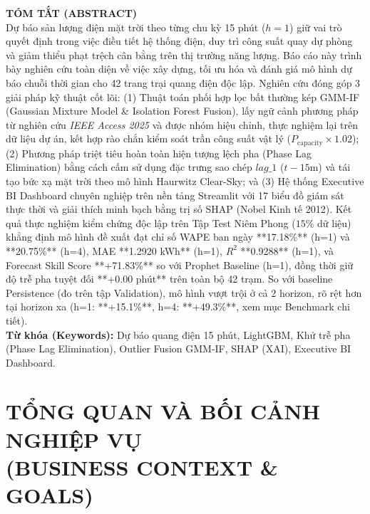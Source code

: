 \documentclass[12pt,a4paper]{article}
\begin{document}
\begin{center}
\begin{minipage}{0.92\linewidth}
\small
\textbf{\large TÓM TẮT (ABSTRACT)} \vspace{0.2cm} \\
Dự báo sản lượng điện mặt trời theo từng chu kỳ 15 phút ($h=1$) giữ vai trò quyết định trong việc điều tiết hệ thống điện, duy trì công suất quay dự phòng và giảm thiểu phạt trệch cân bằng trên thị trường năng lượng. Báo cáo này trình bày nghiên cứu toàn diện về việc xây dựng, tối ưu hóa và đánh giá mô hình dự báo chuỗi thời gian cho 42 trang trại quang điện độc lập. Nghiên cứu đóng góp 3 giải pháp kỹ thuật cốt lõi: (1) Thuật toán phối hợp lọc bất thường kép GMM-IF (Gaussian Mixture Model \& Isolation Forest Fusion), lấy ngữ cảnh phương pháp từ nghiên cứu \textit{IEEE Access 2025} và được nhóm hiệu chỉnh, thực nghiệm lại trên dữ liệu dự án, kết hợp rào chắn kiểm soát trần công suất vật lý ($P_{\text{capacity}} \times 1.02$); (2) Phương pháp triệt tiêu hoàn toàn hiện tượng lệch pha (Phase Lag Elimination) bằng cách cấm sử dụng đặc trưng sao chép $lag\_1$ ($t-15\text{m}$) và tái tạo bức xạ mặt trời theo mô hình Haurwitz Clear-Sky; và (3) Hệ thống Executive BI Dashboard chuyên nghiệp trên nền tảng Streamlit với 17 biểu đồ giám sát thực thời và giải thích minh bạch bằng trị số SHAP (Nobel Kinh tế 2012). Kết quả thực nghiệm kiểm chứng độc lập trên Tập Test Niêm Phong ($15\%$ dữ liệu) khẳng định mô hình đề xuất đạt chỉ số WAPE ban ngày **17.18\%** (h=1) và **20.75\%** (h=4), MAE **1.2920 kWh** (h=1), $R^2$ **0.9288** (h=1), và Forecast Skill Score **+71.83\%** so với Prophet Baseline (h=1), đồng thời giữ độ trễ pha tuyệt đối **+0.00 phút** trên toàn bộ 42 trạm. So với baseline Persistence (đo trên tập Validation), mô hình vượt trội ở cả 2 horizon, rõ rệt hơn tại horizon xa (h=1: **+15.1\%**, h=4: **+49.3\%**, xem mục Benchmark chi tiết). \vspace{0.3cm} \\
\textbf{Từ khóa (Keywords):} Dự báo quang điện 15 phút, LightGBM, Khử trễ pha (Phase Lag Elimination), Outlier Fusion GMM-IF, SHAP (XAI), Executive BI Dashboard.
\end{minipage}
\end{center}
\vspace{0.5cm}

\tableofcontents
\newpage

\section[TỔNG QUAN VÀ BỐI CẢNH NGHIỆP VỤ]{TỔNG QUAN VÀ BỐI CẢNH NGHIỆP VỤ\\(BUSINESS CONTEXT \& GOALS)}
\end{document}
